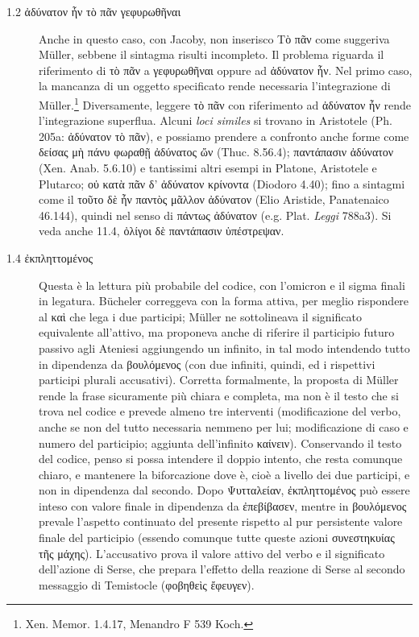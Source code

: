 \begin{description}
\item[1.2 \textgreek{ἀδύνατον ἦν τὸ πᾶν γεφυρωθῆναι}] Anche in questo caso, con Jacoby, non inserisco \textgreek{Τὸ πᾶν } come suggeriva Müller, sebbene il sintagma risulti incompleto. Il problema riguarda il riferimento di \textgreek{τὸ πᾶν} a \textgreek{γεφυρωθῆναι} oppure ad \textgreek{ἀδύνατον ἦν}. Nel primo caso, la mancanza di un oggetto specificato rende necessaria l'integrazione di Müller.\footnote{Xen. Memor. 1.4.17, Menandro F 539 Koch.} Diversamente, leggere \textgreek{τὸ πᾶν} con riferimento ad \textgreek{ἀδύνατον ἦν} rende l'integrazione superflua. Alcuni \textit{loci similes} si trovano in Aristotele (Ph. 205a: \textgreek{ἀδύνατον τὸ πᾶν}), e possiamo prendere a confronto anche forme come \textgreek{δείσας μὴ πάνυ φωραθῇ ἀδύνατος ὤν} (Thuc. 8.56.4); \textgreek{παντάπασιν ἀδύνατον} (Xen. Anab. 5.6.10) e tantissimi altri esempi in Platone, Aristotele e Plutarco; \textgreek{οὐ κατὰ πᾶν δ’ ἀδύνατον κρίνοντα} (Diodoro 4.40); fino a sintagmi come il \textgreek{τοῦτο δὲ ἦν παντὸς μᾶλλον ἀδύνατον} (Elio Aristide, Panatenaico 46.144), quindi nel senso di \textgreek{πάντως ἀδύνατον} (e.g. Plat. \textit{Leggi} 788a3). Si veda anche 11.4, \textgreek{ὀλίγοι δὲ παντάπασιν ὑπέστρεψαν}.
\item[1.4 \textgreek{ἐκπληττομένος}] Questa è la lettura più probabile del codice, con l'omicron e il sigma finali in legatura. Bücheler correggeva con la forma attiva, per meglio rispondere al \textgreek{καὶ} che lega i due participi; Müller ne sottolineava il significato equivalente all'attivo, ma proponeva anche di riferire il participio futuro passivo agli Ateniesi aggiungendo un infinito, in tal modo intendendo tutto in dipendenza da \textgreek{βουλόμενος} (con due infiniti, quindi, ed i rispettivi participi plurali accusativi). Corretta formalmente, la proposta di Müller rende la frase sicuramente più chiara e completa, ma non è il testo che si trova nel codice e prevede almeno tre interventi (modificazione del verbo, anche se non del tutto necessaria nemmeno per lui; modificazione di caso e numero del participio; aggiunta dell'infinito \textgreek{καίνειν}). Conservando il testo del codice, penso si possa intendere il doppio intento, che resta comunque chiaro, e mantenere la biforcazione dove è, cioè a livello dei due participi, e non in dipendenza dal secondo. Dopo \textgreek{Ψυτταλείαν, ἐκπληττομένος} può essere inteso con valore finale in dipendenza da \textgreek{ἐπεβίβασεν}, mentre in \textgreek{βουλόμενος} prevale l'aspetto continuato del presente rispetto al pur persistente valore finale del participio (essendo comunque tutte queste azioni \textgreek{συνεστηκυίας τῆς μάχης}). L'accusativo prova il valore attivo del verbo e il significato dell'azione di Serse, che prepara l'effetto della reazione di Serse al secondo messaggio di  Temistocle (\textgreek{φοβηθεὶς ἔφευγεν}).

\end{description}
